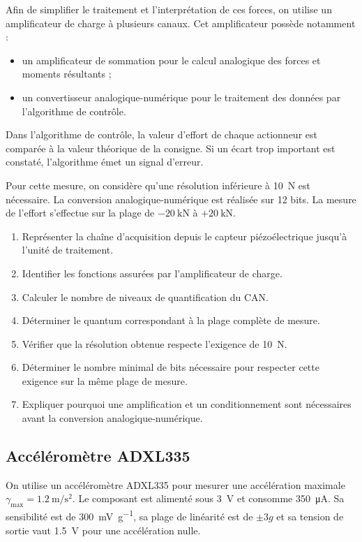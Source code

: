 Afin de simplifier le traitement et l'interprétation de ces forces, on utilise un amplificateur de charge à plusieurs canaux. Cet amplificateur possède notamment :
\begin{itemize}
  \item un amplificateur de sommation pour le calcul analogique des forces et moments résultants ;
  \item un convertisseur analogique-numérique pour le traitement des données par l'algorithme de contrôle.
\end{itemize}

Dans l'algorithme de contrôle, la valeur d'effort de chaque actionneur est comparée à la valeur théorique de la consigne. Si un écart trop important est constaté, l'algorithme émet un signal d'erreur.

Pour cette mesure, on considère qu'une résolution inférieure à \SI{10}{\newton} est nécessaire. La conversion analogique-numérique est réalisée sur 12 bits. La mesure de l'effort s'effectue sur la plage de $-\SI{20}{\kilo\newton}$ à $+\SI{20}{\kilo\newton}$.

\begin{enumerate}
  \item Représenter la chaîne d'acquisition depuis le capteur piézoélectrique jusqu'à l'unité de traitement.
  \item Identifier les fonctions assurées par l'amplificateur de charge.
  \item Calculer le nombre de niveaux de quantification du CAN.
  \item Déterminer le quantum correspondant à la plage complète de mesure.
  \item Vérifier que la résolution obtenue respecte l'exigence de \SI{10}{\newton}.
  \item Déterminer le nombre minimal de bits nécessaire pour respecter cette exigence sur la même plage de mesure.
  \item Expliquer pourquoi une amplification et un conditionnement sont nécessaires avant la conversion analogique-numérique.
\end{enumerate}

\subsection{Accéléromètre ADXL335}

On utilise un accéléromètre ADXL335 pour mesurer une accélération maximale $\gamma_{\max}=\SI{1.2}{\metre\per\second\squared}$. Le composant est alimenté sous \SI{3}{\volt} et consomme \SI{350}{\micro\ampere}. Sa sensibilité est de \SI{300}{\milli\volt\per g}, sa plage de linéarité est de $\pm 3g$ et sa tension de sortie vaut \SI{1.5}{\volt} pour une accélération nulle.

